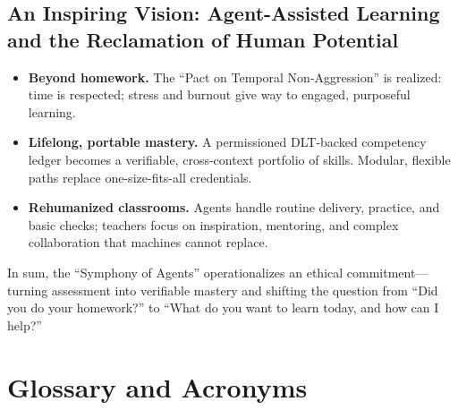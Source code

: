\documentclass[12pt,a4paper]{article}
\begin{document}
\subsection{An Inspiring Vision: Agent-Assisted Learning and the Reclamation of Human Potential}
\begin{itemize}[leftmargin=1.2em]
  \item \textbf{Beyond homework.} The \enquote{Pact on Temporal Non-Aggression} is realized: time is respected; stress and burnout give way to engaged, purposeful learning.
  \item \textbf{Lifelong, portable mastery.} A permissioned DLT-backed competency ledger becomes a verifiable, cross-context portfolio of skills. Modular, flexible paths replace one-size-fits-all credentials.
  \item \textbf{Rehumanized classrooms.} Agents handle routine delivery, practice, and basic checks; teachers focus on inspiration, mentoring, and complex collaboration that machines cannot replace.
\end{itemize}

\noindent In sum, the \enquote{Symphony of Agents} operationalizes an ethical commitment---turning assessment into verifiable mastery and shifting the question from \enquote{Did you do your homework?} to \enquote{What do you want to learn today, and how can I help?}

\section{Glossary and Acronyms}
\glsaddall
\printglossary[title={Glossary},toctitle={Glossary}]
\printglossary[type=\acronymtype,title={Acronyms},toctitle={Acronyms}]

\printbibliography[heading=bibintoc,title={References}]
\end{document}

